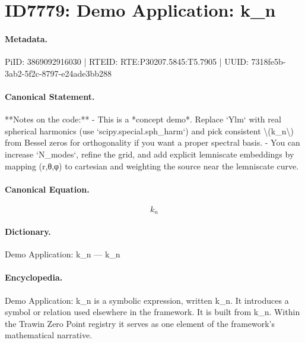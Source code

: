 \section*{ID7779: Demo Application: k\_n}
\paragraph{Metadata.}
PiID: 3869092916030 | RTEID: RTE:P30207.5845:T5.7905 | UUID: 7318fe5b-3ab2-5f2c-8797-e24ade3bb288

\paragraph{Canonical Statement.}
**Notes on the code:** - This is a *concept demo*. Replace `Ylm` with real spherical harmonics (use `scipy.special.sph\_harm`) and pick consistent \textbackslash{}(k\_n\textbackslash{}) from Bessel zeros for orthogonality if you want a proper spectral basis. - You can increase `N\_modes`, refine the grid, and add explicit lemniscate embeddings by mapping (r,θ,φ) to cartesian and weighting the source near the lemniscate curve.

\paragraph{Canonical Equation.}
\[
k_n
\]

\paragraph{Dictionary.}
Demo Application: k\_n — k\_n

\paragraph{Encyclopedia.}
Demo Application: k\_n is a symbolic expression, written k\_n. It introduces a symbol or relation used elsewhere in the framework. It is built from k\_n. Within the Trawin Zero Point registry it serves as one element of the framework's mathematical narrative.
